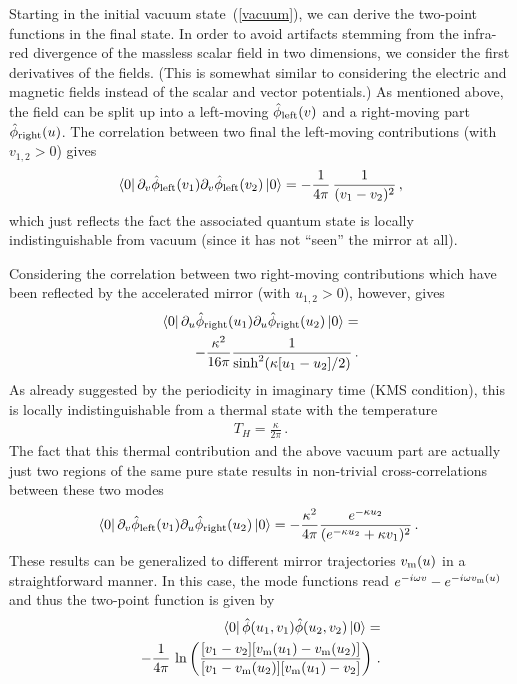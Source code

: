 \documentclass[aps,prd,showpacs,amssymb,nofootinbib,twocolumn]{revtex4}
\newcommand{\ket}[1]{\left|#1\right>}
\newcommand{\bra}[1]{\left<#1\right|}
\newcommand{\nn}{\nonumber\\}
\newcommand{\bea}{\begin{eqnarray}}
\newcommand{\ea}{\end{eqnarray}}
\begin{document}
Starting in the initial vacuum state~(\ref{vacuum}), we can derive the 
two-point functions in the final state. 
%
In order to avoid artifacts %
stemming from the infra-red divergence of the massless scalar field in two 
dimensions, we consider the first derivatives of the fields.
%
(This is somewhat similar to considering the electric and magnetic fields 
instead of the scalar and vector potentials.) 
%
As mentioned above, the field can be split up into a left-moving 
$\hat\phi_{\rm left}(v)$ and a right-moving part $\hat\phi_{\rm right}(u)$.
%
The correlation between two final the left-moving contributions 
(with $v_{1,2}>0$) gives 
%
\bea
\bra{0}
\partial_v\hat\phi_{\rm left}(v_1)\partial_v\hat\phi_{\rm left}(v_2)
\ket{0}
=
-\frac{1}{4\pi}\,\frac{1}{(v_1-v_2)^2}
\,,
\ea
%
which just reflects the fact the associated quantum state is locally 
indistinguishable from vacuum (since it has not ``seen'' the mirror at all).  

Considering the correlation between two right-moving contributions which have 
been  reflected by the accelerated mirror (with $u_{1,2}>0$), however, gives  
%
\bea
\bra{0}
\partial_u\hat\phi_{\rm right}(u_1)\partial_u\hat\phi_{\rm right}(u_2)
\ket{0}
=
\nn
-\frac{\kappa^2}{16\pi}
\frac{1}{\sinh^2(\kappa[u_1-u_2]/2)}
\,.
\ea
%
As already suggested by the periodicity in imaginary time (KMS condition), 
this is locally indistinguishable from a thermal state with the temperature 
%
\bea
T_H=\frac{\kappa}{2\pi}
\,.
\ea
%
The fact that this thermal contribution and the above vacuum part are actually 
just two regions of the same pure state results in non-trivial 
cross-correlations between these two modes 
%
\bea
\bra{0}
\partial_v\hat\phi_{\rm left}(v_1)\partial_u\hat\phi_{\rm right}(u_2)
\ket{0}
=
-\frac{\kappa^2}{4\pi}
\frac{e^{-\kappa u_2}}{(e^{-\kappa u_2}+\kappa v_1)^2}
\,.\;
\ea
%
These results can be generalized to different mirror trajectories $v_{\rm m}(u)$ 
in a straightforward manner.
%
In this case, the mode functions read $e^{-i\omega v}-e^{-i\omega v_{\rm m}(u)}$ 
and thus the two-point function is given by 
%
\bea
\bra{0}\hat\phi(u_1,v_1)\hat\phi(u_2,v_2)\ket{0}
=
\nn
-\frac{1}{4\pi}
\,\ln\left(
\frac{[v_1-v_2][v_{\rm m}(u_1)-v_{\rm m}(u_2)]}
{[v_1-v_{\rm m}(u_2)][v_{\rm m}(u_1)-v_2]}
\right)
%
\,.
\ea
%
\end{document}
